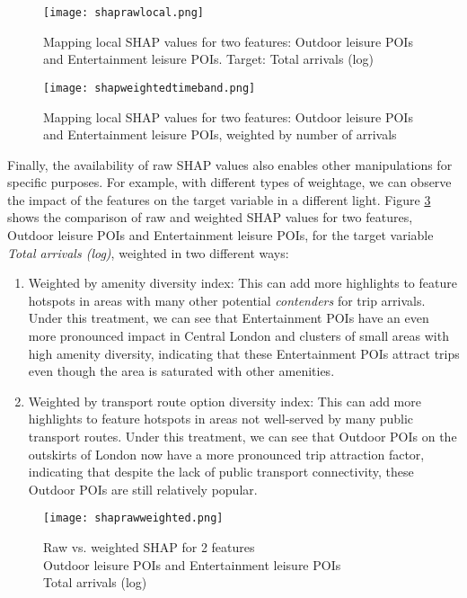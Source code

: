 \begin{figure}[ht]
    \centering
    \texttt{[image: shaprawlocal.png]}
    \captionsetup{justification=centering}
    \caption{Mapping local SHAP values for two features: Outdoor leisure POIs and Entertainment leisure POIs. Target: Total arrivals (log)}
    \label{fig:shapraw}
\end{figure}

\begin{figure}[ht]
    \centering
    \texttt{[image: shapweightedtimeband.png]}
    \captionsetup{justification=centering}
    \caption{Mapping local SHAP values for two features: Outdoor leisure POIs and Entertainment leisure POIs, weighted by number of arrivals}
    \label{fig:shapweightedtimeband}
\end{figure}

Finally, the availability of raw SHAP values also enables other manipulations for specific purposes. For example, with different types of weightage, we can observe the impact of the features on the target variable in a different light. Figure \ref{fig:shaprawweighted} shows the comparison of raw and weighted SHAP values for two features, Outdoor leisure POIs and Entertainment leisure POIs, for the target variable \textit{Total arrivals (log)}, weighted in two different ways:

\begin{enumerate}
    \setlength\itemsep{0em}
    \item Weighted by amenity diversity index: This can add more highlights to feature hotspots in areas with many other potential \textit{contenders} for trip arrivals. Under this treatment, we can see that Entertainment POIs have an even more pronounced impact in Central London and clusters of small areas with high amenity diversity, indicating that these Entertainment POIs attract trips even though the area is saturated with other amenities.
    \item Weighted by transport route option diversity index: This can add more highlights to feature hotspots in areas not well-served by many public transport routes. Under this treatment, we can see that Outdoor POIs on the outskirts of London now have a more pronounced trip attraction factor, indicating that despite the lack of public transport connectivity, these Outdoor POIs are still relatively popular.
\end{enumerate}

\begin{figure}[!hbt]
    \centering
    \texttt{[image: shaprawweighted.png]}
    \captionsetup{justification=centering}
    \caption{Raw vs. weighted SHAP for 2 features\\Outdoor leisure POIs and Entertainment leisure POIs \\Total arrivals (log)}
    \label{fig:shaprawweighted}
\end{figure}

